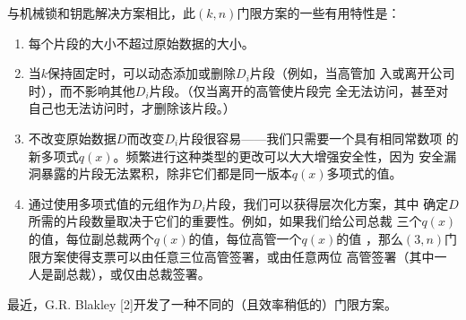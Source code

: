 与机械锁和钥匙解决方案相比，此$(k, n)$门限方案的一些有用特性是：

\begin{enumerate}
	\item 每个片段的大小不超过原始数据的大小。
	\item 当$k$保持固定时，可以动态添加或删除$D_i$片段（例如，当高管加
	      入或离开公司时），而不影响其他$D_i$片段。（仅当离开的高管使片段完
	      全无法访问，甚至对自己也无法访问时，才删除该片段。）
	\item 不改变原始数据$D$而改变$D_i$片段很容易——我们只需要一个具有相同常数项
	      的新多项式$q(x)$。频繁进行这种类型的更改可以大大增强安全性，因为
	      安全漏洞暴露的片段无法累积，除非它们都是同一版本$q(x)$多项式的值。
	\item 通过使用多项式值的元组作为$D_i$片段，我们可以获得层次化方案，其中
	      确定$D$所需的片段数量取决于它们的重要性。例如，如果我们给公司总裁
	      三个$q(x)$的值，每位副总裁两个$q(x)$的值，每位高管一个$q(x)$的值
	      ，那么$(3, n)$门限方案使得支票可以由任意三位高管签署，或由任意两位
	      高管签署（其中一人是副总裁），或仅由总裁签署。
\end{enumerate}

最近，G.R. Blakley [2]开发了一种不同的（且效率稍低的）门限方案。
